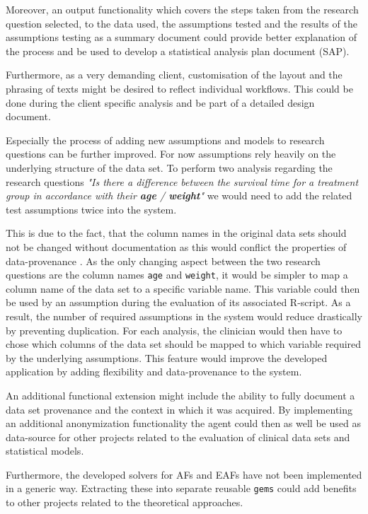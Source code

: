 Moreover, an output functionality which covers the steps taken from the research question selected, to the data used, the assumptions tested and the results of the assumptions testing as a summary document could provide better explanation of the process and be used to develop a statistical analysis plan document (SAP).

Furthermore, as a very demanding client, customisation of the layout and the phrasing of texts might be desired to reflect individual workflows. This could be done during the client specific analysis and be part of a detailed design document.


Especially the process of adding new assumptions and models to research questions can be further improved. For now assumptions rely heavily on the underlying structure of the data set. To perform two analysis regarding the research questions \textit{"Is there a difference between the survival time for a treatment group in accordance with their \textbf{age} / \textbf{weight}"} we would need to add the related test assumptions twice into the system. 

This is due to the fact, that the column names in the original data sets should not be changed without documentation as this would conflict the properties of data-provenance \cite{provenance}. As the only changing aspect between the two research questions are the column names \texttt{age} and \texttt{weight}, it would be simpler to map a column name of the data set to a specific variable name. This variable could then be used by an assumption during the evaluation of its associated \gls{R}-script. As a result, the number of required assumptions in the system would reduce drastically by preventing duplication. For each analysis, the clinician would then have to chose which columns of the data set should be mapped to which variable required by the underlying assumptions. This feature would improve the developed application by adding flexibility and data-provenance to the system.

An additional functional extension might include the ability to fully document a data set provenance and the context in which it was acquired. By implementing an additional anonymization functionality the agent could then as well be used as data-source for other projects related to the evaluation of clinical data sets and statistical models.

Furthermore, the developed solvers for \glspl{AF} and \glspl{EAF} have not been implemented in a generic way. Extracting these into separate reusable \texttt{gems} could add benefits to other projects related to the theoretical approaches.
